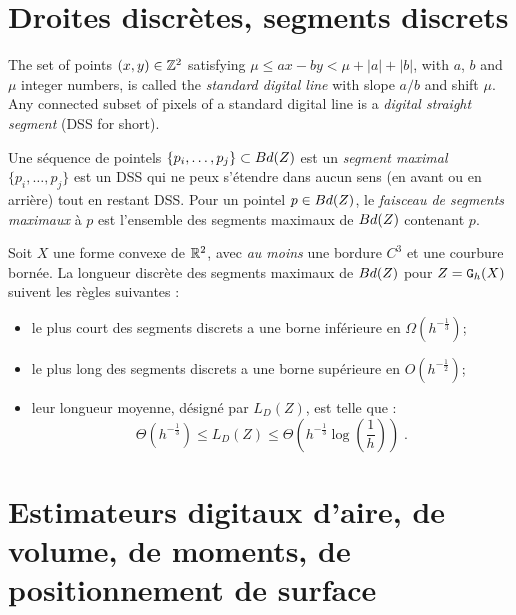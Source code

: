 \section{Droites discrètes, segments discrets}
%
\begin{definition}
  The set of points $(x,y)\in\mathbb{Z}^2$ satisfying $\mu \le ax - by < \mu +
  |a| + |b|$, with $a$, $b$ and $\mu$ integer numbers, is called the
  {\em standard digital line} with slope $a/b$ and shift $\mu$.  Any
  connected subset of pixels of a standard digital line is a
  \emph{digital straight segment} (DSS for short).
\end{definition}
%
\begin{definition}
  Une séquence de pointels $\{p_i,\ldots,p_j\}\subset Bd({Z})$ est un {\em
    segment maximal} \ssi $\{p_i,\ldots,p_j\}$ est un DSS qui ne peux s'étendre dans aucun sens (en avant ou en arrière) tout en restant DSS.
    Pour un pointel $p\in Bd({Z})$, le \emph{faisceau de segments maximaux} à $p$ est l'ensemble des segments maximaux de $Bd({Z})$ contenant $p$.
\end{definition}
%
\begin{lemma}
  \label{lem-asymptotic-digital-length-ms}
   Soit $X$ une forme convexe de $\mathbb{R}^2$, avec \emph{au moins} une
   bordure $C^3$  et une courbure bornée.  La longueur discrète des
   segments maximaux de $Bd({Z})$ pour $Z=\mathtt{G}_{h}(X)$ suivent les règles suivantes :
   \begin{itemize}
   \item le plus court des segments discrets a une borne inférieure en
     $\Omega(h^{-\frac{1}{3}})$;
   \item le plus long des segments discrets a une borne supérieure en
     $O(h^{-\frac{1}{2}})$;
   \item leur longueur moyenne, désigné par $L_D({Z})$, est telle que :
  \begin{equation}
    \label{eq:lengthMS}
    \Theta(h^{-\frac{1}{3}}) \le L_D( {Z} ) \le \Theta(h^{-\frac{1}{3}} \log \left(\frac{1}{h}\right))\;.
  \end{equation}
   \end{itemize}
\end{lemma}
%
\section{Estimateurs digitaux d'aire, de volume, de moments, de positionnement de surface}
%
